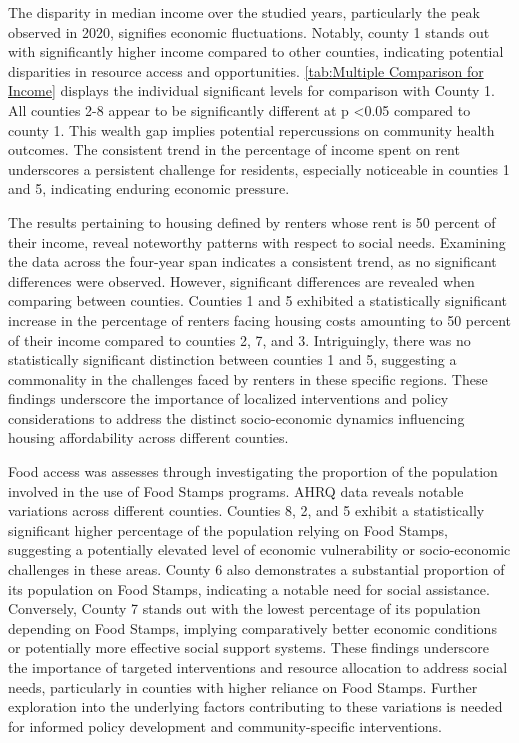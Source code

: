 \documentclass[12pt]{article}
\begin{document}
The disparity in median income over the studied years, particularly the peak observed in 2020, 
signifies economic fluctuations. Notably, county 1 stands out with significantly higher income 
compared to other counties, indicating potential disparities in resource access and opportunities. 
\ref{tab:Multiple Comparison for Income}
 displays the individual significant levels for comparison with County 1.
All counties 2-8 appear to be significantly different at p <0.05 compared to county 1.
This wealth gap implies potential repercussions on community health outcomes. The consistent trend in 
the percentage of income spent on rent underscores a persistent challenge for residents, especially 
noticeable in counties 1 and 5, indicating enduring economic pressure.

The results pertaining to housing defined by renters whose rent is 50 percent of their income, 
reveal noteworthy patterns with respect to social needs. Examining the data across the four-year span 
indicates a consistent trend, as no significant differences were observed. However, significant differences are 
revealed when comparing between counties. Counties 1 and 5 exhibited a statistically significant increase 
in the percentage of renters facing housing costs amounting to 50 percent of their income compared to 
counties 2, 7, and 3. Intriguingly, there was no statistically significant distinction between counties 
1 and 5, suggesting a commonality in the challenges faced by renters in these specific regions. These 
findings underscore the importance of localized interventions and policy considerations to address the 
distinct socio-economic dynamics influencing housing affordability across different counties.

Food access was assesses through investigating the proportion of the population involved in the use of Food Stamps programs.
AHRQ data reveals notable variations across different counties. Counties 8, 2, and 5 exhibit a statistically significant 
higher percentage of the population relying on Food Stamps, suggesting a potentially elevated level of economic 
vulnerability or socio-economic challenges in these areas. County 6 also demonstrates a substantial proportion 
of its population on Food Stamps, indicating a notable need for social assistance. Conversely, County 7 stands 
out with the lowest percentage of its population depending on Food Stamps, implying comparatively better 
economic conditions or potentially more effective social support systems. These findings underscore the 
importance of targeted interventions and resource allocation to address social needs, particularly in counties 
with higher reliance on Food Stamps. Further exploration into the underlying factors contributing to these variations 
is needed for informed policy development and community-specific interventions.
\end{document}
